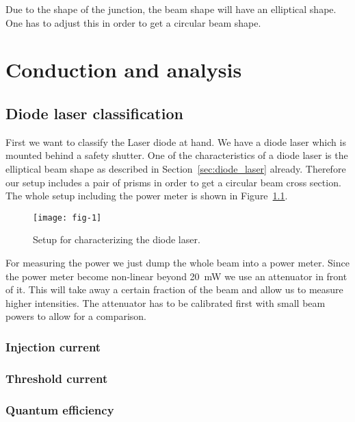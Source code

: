 \documentclass[11pt, english, fleqn, DIV=15, headinclude, BCOR=2cm]{scrreprt}
\begin{document}
Due to the shape of the junction, the beam shape will have an elliptical shape.
One has to adjust this in order to get a circular beam shape.

\chapter{Conduction and analysis}

\section{Diode laser classification}

First we want to classify the Laser diode at hand. We have a diode laser which
is mounted behind a safety shutter. One of the characteristics of a diode laser
is the elliptical beam shape as described in Section~\ref{sec:diode_laser}
already. Therefore our setup includes a pair of prisms in order to get a
circular beam cross section. The whole setup including the power meter is shown
in Figure~\ref{fig:fig-1}.

\begin{figure}
    \centering
    \texttt{[image: fig-1]}
    \caption{%
        Setup for characterizing the diode laser.
        \parencite[Figure~1]{lab-course/doubling/manual}
    }
    \label{fig:fig-1}
\end{figure}

For measuring the power we just dump the whole beam into a power meter. Since
the power meter become non-linear beyond \SI{20}{\milli\watt} we use an
attenuator in front of it. This will take away a certain fraction of the beam
and allow us to measure higher intensities. The attenuator has to be calibrated
first with small beam powers to allow for a comparison.


\subsection{Injection current}


\subsection{Threshold current}


\subsection{Quantum efficiency}
\end{document}

